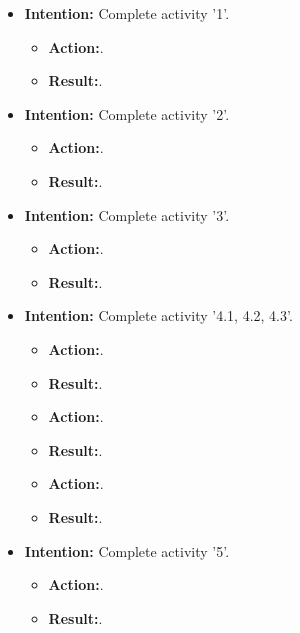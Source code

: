 \documentclass{article}
\begin{document}
\begin{itemize}
\item{\textbf{Intention:} Complete activity '1'.}

\begin{itemize}
\item{\textbf{Action:}.}
\item{\textbf{Result:}.}
\end{itemize}

\item{\textbf{Intention:} Complete activity '2'.}

\begin{itemize}
\item{\textbf{Action:}.}
\item{\textbf{Result:}.}
\end{itemize}

\item{\textbf{Intention:} Complete activity '3'.}

\begin{itemize}
\item{\textbf{Action:}.}
\item{\textbf{Result:}.}
\end{itemize}

\item{\textbf{Intention:} Complete activity '4.1, 4.2, 4.3'.}

\begin{itemize}
\item{\textbf{Action:}.}
\item{\textbf{Result:}.}

\item{\textbf{Action:}.}
\item{\textbf{Result:}.}

\item{\textbf{Action:}.}
\item{\textbf{Result:}.}
\end{itemize}

\item{\textbf{Intention:} Complete activity '5'.}

\begin{itemize}
\item{\textbf{Action:}.}
\item{\textbf{Result:}.}
\end{itemize}



\end{itemize}
\end{document}
